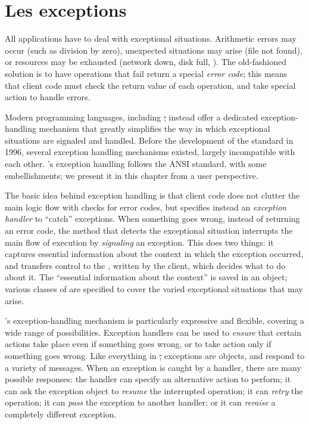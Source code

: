 \documentclass[a4paper,10pt,twoside]{book}
\begin{document}
	\sloppy
\fi

\chapter{Les exceptions}


All applications have to deal with exceptional situations.
Arithmetic errors may occur (such as division by zero), unexpected situations may arise (file not found), or resources may be exhausted (network down, disk full, \etc).
The old-fashioned solution is to have operations that fail return a special \emph{error code}; this means that client code must check the return value of each operation, and take special action to handle errors.

Modern programming languages, including \st, instead offer a dedicated exception-handling mechanism that greatly simplifies the way in which exceptional situations are signaled and handled.
Before the development of the  standard in 1996, several  exception handling mechanisms existed, largely incompatible with each other. \pharo's exception handling follows the ANSI standard, with some embellishments; we present it in this chapter from a user perspective.

The basic idea behind exception handling is that 
client code does not clutter the main logic flow with checks for error codes, but specifies instead an \emph{exception handler} to ``catch'' exceptions.
When something goes wrong, instead of returning an error code, the method that detects the exceptional situation interrupts the main flow of execution by  \emph{signaling} an exception.
This does two things: it captures essential information about the context in which the exception occurred, and transfers control to the , written by the client, which decides what to do about it.
The ``essential information about the context'' is saved in an  object; 
various classes of  are specified to cover the varied exceptional situations that may arise.

\pharo's exception-handling mechanism is particularly expressive and flexible, covering a wide range of possibilities. Exception handlers can be used to \emph{ensure} that certain actions take place even if something goes wrong, or to take action only if something goes wrong.
Like everything in \st, exceptions are objects, and respond to a variety of messages.
When an exception is caught by a handler, there are many possible responses: the  handler can specify an alternative action to perform; it can ask the exception object to \emph{resume} the interrupted operation; it can \emph{retry} the operation; it can \emph{pass} the exception to another handler; or it can \emph{reraise} a completely different exception.
\end{document}

